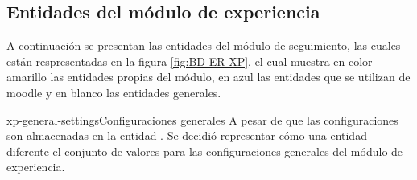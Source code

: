 \clearpage
\subsection{Entidades del módulo de experiencia}


 A continuación se presentan las entidades del módulo de seguimiento,
 las cuales están respresentadas en la figura  \ref{fig:BD-ER-XP},
 el cual muestra en color amarillo las entidades propias del módulo,
 en azul las entidades que se utilizan de moodle  y en blanco las entidades generales.


    \begin{cdtEntidad}{xp-general-settings}{Configuraciones generales}{
    A pesar de que las configuraciones son almacenadas en la entidad
    . Se decidió representar cómo una entidad diferente
    el conjunto de valores para las configuraciones generales del módulo de
    experiencia.}


    \end{cdtEntidad}

